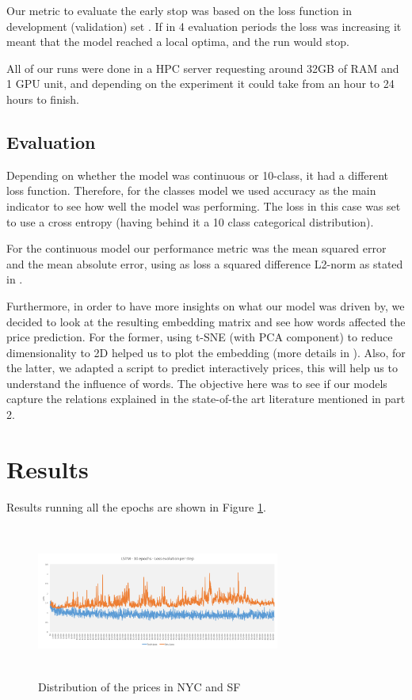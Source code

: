 \documentclass[11pt,letterpaper]{article}
\begin{document}
Our metric to evaluate the early stop was based on the loss function in development (validation) set . If in 4 evaluation periods the loss was increasing it meant that the model reached a local optima, and the run would stop. 

All of our runs were done in a HPC server requesting around 32GB of RAM and 1 GPU unit, and depending on the experiment it could take from an hour to 24 hours to finish. 

\subsection{Evaluation}
Depending on whether the model was continuous or 10-class, it had a different loss function. Therefore, for the classes model we used accuracy as the main indicator to see how well the model was performing. The loss in this case was set to use a cross entropy (having behind it a 10 class categorical distribution). 

For the continuous model our performance metric was the mean squared error and the mean absolute error, using as loss a squared difference L2-norm as stated in \cite{cho2015natural}.

Furthermore, in order to have more insights on what our model was driven by, we decided to look at the resulting embedding matrix and see how words affected the price prediction. For the former, using t-SNE (with PCA component) to reduce dimensionality to 2D helped us to plot the embedding (more details in \cite{maaten2008visualizing}). Also, for the latter, we adapted a script to predict interactively prices, this will help us to understand the influence of words. The objective here was to see if our models capture the relations explained in the state-of-the art literature mentioned in part 2.

\section{Results}
Results running all the epochs are shown in Figure \ref{fig:lstm_10ep}.
 
   \begin{figure}[thpb]
      \centering
      \includegraphics[width=8cm, height=5cm]{lstm_10ep}
      \caption{Distribution of the prices in NYC and SF}
      \label{fig:lstm_10ep}
   \end{figure}
\end{document}

